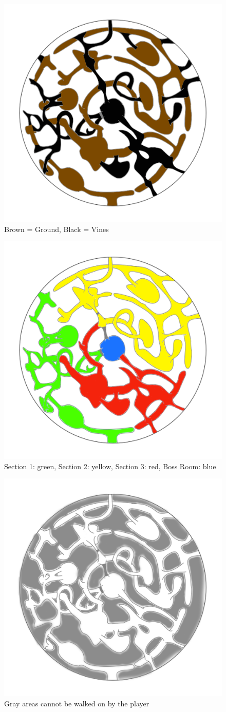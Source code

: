 \begin{figure}[H]
	\centering
	\includegraphics[width=0.6\linewidth]{images/map/2D_map_color.png}
	\caption*{Brown = Ground, Black = Vines}
\end{figure}

\begin{figure}[H]
	\centering
	\includegraphics[width=0.6\linewidth]{images/map/map_all_sections.png}
	\caption*{Section 1: green, Section 2: yellow, Section 3: red, Boss Room: blue}
\end{figure}

\begin{figure}[H]
	\centering
	\includegraphics[width=0.6\linewidth]{images/map/2D_map_not.png}
	\caption*{Gray areas cannot be walked on by the player}
\end{figure}
\newpage

